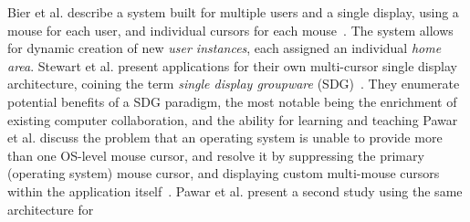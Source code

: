 \documentclass[runningheads,a4paper]{llncs}
\begin{document}
Bier et al. describe a system built for multiple users and a single
display, using a mouse for each user, and individual cursors for each
mouse~\cite{Bier1991}.  The system
allows for dynamic creation of new {\em user instances}, each assigned
an individual {\em home area}. 
%
Stewart et al. present applications for their own multi-cursor single
display architecture, coining the term {\em single display groupware}
(SDG)~\cite{Stewart1999}.  They enumerate potential benefits of a
SDG paradigm, the most notable being the enrichment of existing
computer collaboration, and the ability for learning and teaching
%
Pawar et al. discuss 
the problem that an operating system is unable to provide
more than one OS-level mouse cursor,
and resolve it by
suppressing the primary (operating system) mouse cursor, and
displaying custom multi-mouse cursors within the application
itself~\cite{Pawar2006}.
Pawar et al. present a second study using the same architecture for
\end{document}
